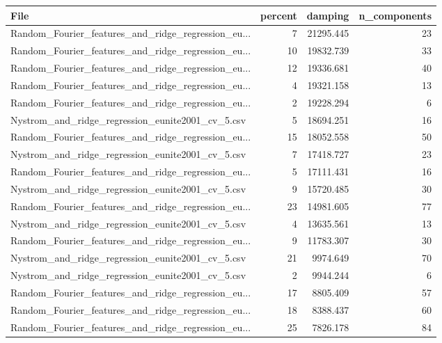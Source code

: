 \begin{tabularx}{\textwidth}{lrrr}
\toprule
                                              File &  percent &   damping &  n\_components \\
\midrule
Random\_Fourier\_features\_and\_ridge\_regression\_eu... &        7 & 21295.445 &            23 \\
Random\_Fourier\_features\_and\_ridge\_regression\_eu... &       10 & 19832.739 &            33 \\
Random\_Fourier\_features\_and\_ridge\_regression\_eu... &       12 & 19336.681 &            40 \\
Random\_Fourier\_features\_and\_ridge\_regression\_eu... &        4 & 19321.158 &            13 \\
Random\_Fourier\_features\_and\_ridge\_regression\_eu... &        2 & 19228.294 &             6 \\
  Nystrom\_and\_ridge\_regression\_eunite2001\_cv\_5.csv &        5 & 18694.251 &            16 \\
Random\_Fourier\_features\_and\_ridge\_regression\_eu... &       15 & 18052.558 &            50 \\
  Nystrom\_and\_ridge\_regression\_eunite2001\_cv\_5.csv &        7 & 17418.727 &            23 \\
Random\_Fourier\_features\_and\_ridge\_regression\_eu... &        5 & 17111.431 &            16 \\
  Nystrom\_and\_ridge\_regression\_eunite2001\_cv\_5.csv &        9 & 15720.485 &            30 \\
Random\_Fourier\_features\_and\_ridge\_regression\_eu... &       23 & 14981.605 &            77 \\
  Nystrom\_and\_ridge\_regression\_eunite2001\_cv\_5.csv &        4 & 13635.561 &            13 \\
Random\_Fourier\_features\_and\_ridge\_regression\_eu... &        9 & 11783.307 &            30 \\
  Nystrom\_and\_ridge\_regression\_eunite2001\_cv\_5.csv &       21 &  9974.649 &            70 \\
  Nystrom\_and\_ridge\_regression\_eunite2001\_cv\_5.csv &        2 &  9944.244 &             6 \\
Random\_Fourier\_features\_and\_ridge\_regression\_eu... &       17 &  8805.409 &            57 \\
Random\_Fourier\_features\_and\_ridge\_regression\_eu... &       18 &  8388.437 &            60 \\
Random\_Fourier\_features\_and\_ridge\_regression\_eu... &       25 &  7826.178 &            84 \\

\end{tabularx}
